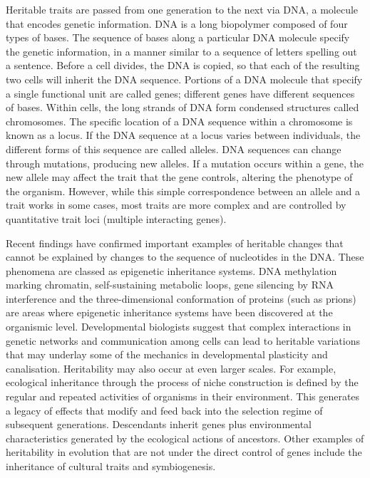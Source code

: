 Heritable traits are passed from one generation to the next via DNA, a molecule that encodes 
genetic information. DNA is a long biopolymer composed of four types of bases.
The sequence of bases along a particular DNA molecule specify the genetic information,
in a manner similar to a sequence of letters spelling out a sentence.
Before a cell divides, the DNA is copied, so that each of the resulting two cells will inherit the
DNA sequence. Portions of a DNA molecule that specify a single functional unit are called genes;
different genes have different sequences of bases.
Within cells, the long strands of DNA form condensed structures called chromosomes.
The specific location of a DNA sequence within a chromosome is known as a locus.
If the DNA sequence at a locus varies between individuals, the different forms of this sequence
are called alleles. DNA sequences can change through mutations, producing new alleles.
If a mutation occurs within a gene, the new allele may affect the trait that the gene controls,
altering the phenotype of the organism.
However, while this simple correspondence between an allele and a trait works in some cases, 
most traits are more complex and are controlled by quantitative trait loci
(multiple interacting genes).

Recent findings have confirmed important examples of heritable changes that cannot be explained by
changes to the sequence of nucleotides in the DNA.
These phenomena are classed as epigenetic inheritance systems.
DNA methylation marking chromatin, self-sustaining metabolic loops, gene silencing by RNA 
interference and the three-dimensional conformation of proteins (such as prions) are areas where
epigenetic inheritance systems have been discovered at the organismic level. 
Developmental biologists suggest that complex interactions in genetic networks and communication 
among cells can lead to heritable variations that may underlay some of the mechanics in
developmental plasticity and canalisation.
Heritability may also occur at even larger scales. For example, ecological inheritance through
the process of niche construction is defined by the regular and repeated activities
of organisms in their environment. 
This generates a legacy of effects that modify and feed back into the selection regime of 
subsequent generations.
Descendants inherit genes plus environmental characteristics generated by the ecological
actions of ancestors.
Other examples of heritability in evolution that are not under the direct control of genes 
include the inheritance of cultural traits and symbiogenesis. 
